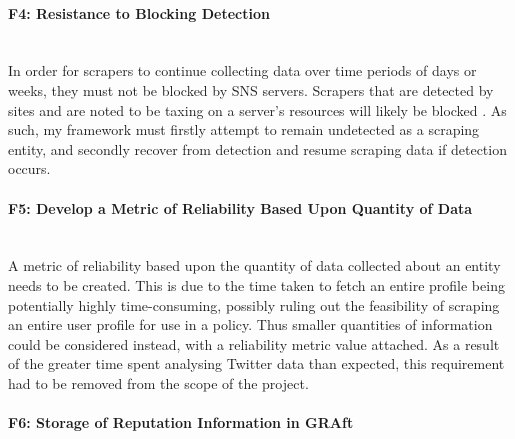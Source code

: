 
\paragraph{ F4: Resistance to Blocking Detection}\hspace{0pt} \\

\noindent In order for scrapers to continue collecting data over time periods of days or weeks, they must not be blocked by SNS servers. Scrapers that are detected by sites and are noted to be taxing on a server's resources will likely be blocked \cite{no_api_for_me}. As such, my framework must firstly attempt to remain undetected as a scraping entity, and secondly recover from detection and resume scraping data if detection occurs. 

\paragraph{ F5: Develop a Metric of Reliability Based Upon Quantity of Data}\hspace{0pt} \\

\noindent A metric of reliability based upon the quantity of data collected about an entity needs to be created. This is due to the time taken to fetch an entire profile being potentially highly time-consuming, possibly ruling out the feasibility of scraping an entire user profile for use in a policy. Thus smaller quantities of information could be considered instead, with a reliability metric value attached. As a result of the greater time spent analysing Twitter data than expected, this requirement had to be removed from the scope of the project.


\paragraph{ F6: Storage of Reputation Information in GRAft}\hspace{0pt} \\

